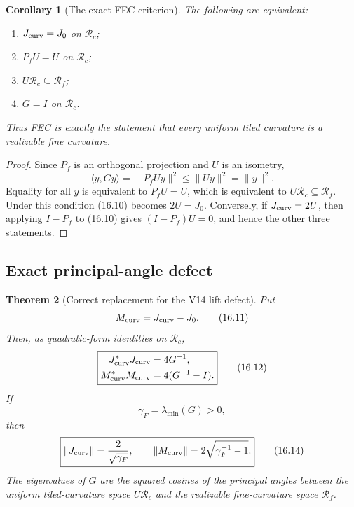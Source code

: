 \documentclass[11pt,oneside]{book}
\newtheorem{theorem}{Theorem}[chapter]
\newtheorem{corollary}[theorem]{Corollary}
\theoremstyle{definition}
\theoremstyle{remark}
\begin{document}
\begin{corollary}[The exact FEC criterion]
\label{cor:e8v16-fec}
The following are equivalent:
\begin{enumerate}
\item \(J_{\rm curv}=J_0\) on \(\mathcal R_c\);
\item \(P_fU=U\) on \(\mathcal R_c\);
\item \(U\mathcal R_c\subseteq\mathcal R_f\);
\item \(G=I\) on \(\mathcal R_c\).
\end{enumerate}
Thus FEC is exactly the statement that every uniform tiled curvature
is a realizable fine curvature.
\end{corollary}

\begin{proof}
Since \(P_f\) is an orthogonal projection and \(U\) is an isometry,
\[
 \langle y,Gy\rangle=\|P_fUy\|^2\leq\|Uy\|^2=\|y\|^2.
\]
Equality for all \(y\) is equivalent to \(P_fU=U\), which is
equivalent to \(U\mathcal R_c\subseteq\mathcal R_f\).  Under this
condition (16.10) becomes \(2U=J_0\).  Conversely, if
\(J_{\rm curv}=2U\), then applying \(I-P_f\) to (16.10) gives
\((I-P_f)U=0\), and hence the other three statements.
\end{proof}

\subsection{Exact principal-angle defect}

\begin{theorem}[Correct replacement for the V14 lift defect]
\label{thm:e8v16-defect}
Put
\[
             M_{\rm curv}=J_{\rm curv}-J_0.                         \tag{16.11}
\]
Then, as quadratic-form identities on \(\mathcal R_c\),
\[
\boxed{
\begin{aligned}
 J_{\rm curv}^*J_{\rm curv}&=4G^{-1},\\
 M_{\rm curv}^*M_{\rm curv}&=4(G^{-1}-I).
\end{aligned}}                                                     \tag{16.12}
\]
If
\[
                    \gamma_F=\lambda_{\min}(G)>0,                  \tag{16.13}
\]
then
\[
\boxed{
\|J_{\rm curv}\|=\frac2{\sqrt{\gamma_F}},\qquad
\|M_{\rm curv}\|=2\sqrt{\gamma_F^{-1}-1}.}                          \tag{16.14}
\]
The eigenvalues of \(G\) are the squared cosines of the principal
angles between the uniform tiled-curvature space \(U\mathcal R_c\)
and the realizable fine-curvature space \(\mathcal R_f\).
\end{theorem}
\end{document}
